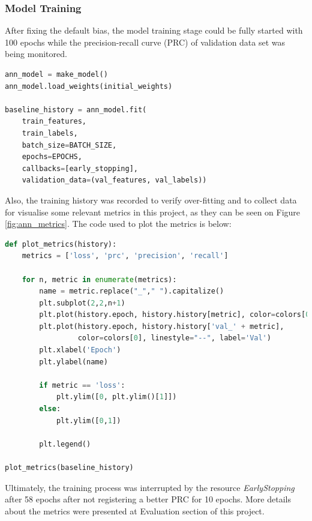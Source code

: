 \documentclass{article}
\begin{document}
\subsubsection{Model Training}

After fixing the default bias, the model training stage could be fully started with 100 epochs while the precision-recall curve (PRC) of validation data set was being monitored. 

\begin{lstlisting}[language=Python]
ann_model = make_model()
ann_model.load_weights(initial_weights)

baseline_history = ann_model.fit(
    train_features,
    train_labels,
    batch_size=BATCH_SIZE,
    epochs=EPOCHS,
    callbacks=[early_stopping],
    validation_data=(val_features, val_labels))
\end{lstlisting}

Also, the training history was recorded to verify over-fitting and to collect data for visualise some relevant metrics in this project, as they can be seen on Figure \ref{fig:ann_metrics}. The code used to plot the metrics is below:

\begin{lstlisting}[language=Python]
def plot_metrics(history):
    metrics = ['loss', 'prc', 'precision', 'recall']
    
    for n, metric in enumerate(metrics):
        name = metric.replace("_"," ").capitalize()
        plt.subplot(2,2,n+1)
        plt.plot(history.epoch, history.history[metric], color=colors[0], label='Train')
        plt.plot(history.epoch, history.history['val_' + metric],
                 color=colors[0], linestyle="--", label='Val')
        plt.xlabel('Epoch')
        plt.ylabel(name)
        
        if metric == 'loss':
            plt.ylim([0, plt.ylim()[1]])
        else:
            plt.ylim([0,1])

        plt.legend()

plot_metrics(baseline_history)
\end{lstlisting}

Ultimately, the training process was interrupted by the resource \emph{EarlyStopping} after 58 epochs after not registering a better PRC for 10 epochs. More details about the metrics were presented at Evaluation section of this project.
\end{document}

